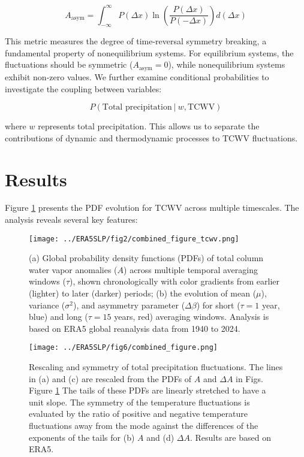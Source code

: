 \documentclass{article}
\begin{document}
\[A_{\text{asym}} = \int_{- \infty}^{\infty}P(\Delta x)\ln(\frac{P(\Delta x)}{P( - \Delta x)})d(\Delta x)\]

This metric measures the degree of time-reversal symmetry breaking, a
fundamental property of nonequilibrium systems. For equilibrium systems,
the fluctuations should be symmetric (\(A_{\text{asym}} = 0\)), while
nonequilibrium systems exhibit non-zero values. We further examine
conditional probabilities to investigate the coupling between variables:

\[P\left( \mathrm{\text{Total precipitation}}~|~w,\mathrm{\text{TCWV}} \right)\]

where \(w\) represents total precipitation. This allows us to separate
the contributions of dynamic and thermodynamic processes to TCWV
fluctuations.



\section{Results}\label{results}

Figure \ref{fig:pdf-tcwv} presents the PDF evolution for TCWV across multiple
timescales. The analysis reveals several key features:

\begin{figure}[H]
\centering
\texttt{[image: ../ERA5SLP/fig2/combined\_figure\_tcwv.png]}
\caption{(a) Global probability density functions (PDFs) of total column
water vapor anomalies (\(A\)) across multiple temporal averaging windows
(\(\tau\)), shown chronologically with color gradients from earlier
(lighter) to later (darker) periods; (b) the evolution of mean
(\(\mu\)), variance (\(\sigma^{2}\)), and asymmetry parameter
(\(\Delta\beta\)) for short (\(\tau = 1\) year, blue) and long
(\(\tau = 15\) years, red) averaging windows. Analysis is based on ERA5
global reanalysis data from 1940 to 2024.}
\label{fig:pdf-tcwv}{}
\end{figure}


\begin{figure}[H]
\centering
\texttt{[image: ../ERA5SLP/fig6/combined\_figure.png]}

\caption{Rescaling and symmetry of total precipitation fluctuations. The
lines in (a) and (c) are rescaled from the PDFs of \(A\) and
\(\Delta A\) in Figs. Figure \ref{fig:pdf-tcwv} The tails of these PDFs are
linearly stretched to have a unit slope. The symmetry of the temperature
fluctuations is evaluated by the ratio of positive and negative
temperature fluctuations away from the mode against the differences of the
exponents of the tails for (b) \(A\) and (d) \(\Delta A\). Results are
based on ERA5.}
\label{fig:tp-distribution}
\end{figure}
\end{document}
